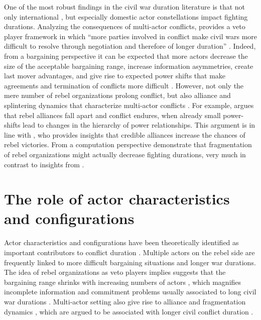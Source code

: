 \documentclass[11pt,oneside,fullpage]{amsart}
\begin{document}
One of the most robust findings in the civil war duration literature is that not only international \citep{balch00,regan02,balch08}, but especially domestic actor constellations impact fighting durations. Analyzing the consequences of multi-actor conflicts, \citet{cunningham06} provides a veto player framework in which ``more parties involved in conflict make civil wars more difficult to resolve through negotiation and therefore of longer duration'' \citep[875]{cunningham06}. Indeed, from a bargaining perspective it can be expected that more actors decrease the size of the acceptable bargaining range, increase information asymmetries, create last mover advantages, and give rise to expected power shifts that make agreements and termination of conflicts more difficult \citep{cunningham06,cunningham2011barriers}. However, not only the mere number of rebel organizations prolong conflict, but also alliance and splintering dynamics that characterize multi-actor conflicts \citep{bakke:2012,bapat:2012,Fjelde2012,cunninghamK:2012}. For example, \citet{Christia2012} argues that rebel alliances fall apart and conflict endures, when already small power-shifts lead to changes in the hierarchy of power relationships. This argument is in line with \citet{akcinaroglu:2012}, who provides insights that credible alliances increase the chances of rebel victories. From a computation perspective \citet{findley:2012} demonstrate that fragmentation of rebel organizations might actually decrease fighting durations, very much in contrast to insights from \citet{cunningham06}. 


\section{The role of actor characteristics and configurations}
Actor characteristics and configurations have been theoretically identified as important contributors to conflict duration \citep[e.g.][]{cunningham06,cunningham09,Christia2012}. Multiple actors on the rebel side are frequently linked to more difficult bargaining situations and longer war durations. The idea of rebel organizations as veto players implies suggests that the bargaining range shrinks with increasing numbers of actors \citep{cunningham06}, which magnifies incomplete information \citep{slantchev2004initiators} and commitment problems usually associated to long civil war durations \citep{fearon04}.  Multi-actor setting also give rise to alliance and fragmentation dynamics \citep{bakke:2012,bapat:2012,Fjelde2012,cunninghamK:2012}, which are argued to be associated with longer civil conflict duration \citep{Christia2012}.
\end{document}

